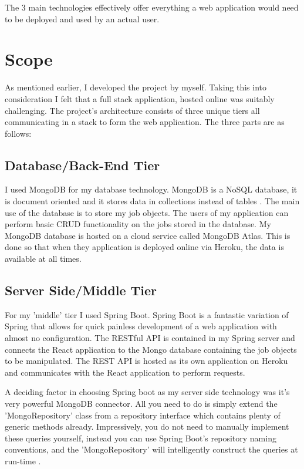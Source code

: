 The 3 main technologies effectively offer everything a web application would need to be deployed and used by an actual user.

\section{Scope}
As mentioned earlier, I developed the project by myself. Taking this into consideration I felt that a full stack application, hosted online was suitably challenging. The project's architecture consists of three unique tiers all communicating in a stack to form the web application. The three parts are as follows: 

\subsection{Database/Back-End Tier}
I used MongoDB for my database technology. MongoDB is a NoSQL database, it is document oriented and it stores data in collections instead of tables \cite{parker2013comparing}. The main use of the database is to store my job objects. The users of my application can perform basic CRUD functionality on the jobs stored in the database. My MongoDB database is hosted on a cloud service called MongoDB Atlas. This is done so that when they application is deployed online via Heroku, the data is available at all times.

\subsection{Server Side/Middle Tier}
For my 'middle' tier I used Spring Boot. Spring Boot is a fantastic variation of Spring that allows for quick painless development of a web application with almost no configuration. The RESTful API is contained in my Spring server and connects the React application to the Mongo database containing the job objects to be manipulated. The REST API is hosted as its own application on Heroku and communicates with the React application to perform requests.

A deciding factor in choosing Spring boot as my server side technology was it's very powerful MongoDB connector. All you need to do is simply extend the 'MongoRepository' class from a repository interface which contains plenty of generic methods already. Impressively, you do not need to manually implement these queries yourself, instead you can use Spring Boot's repository naming conventions, and the 'MongoRepository' will intelligently construct the queries at run-time \cite{marchioni2015mongodb}.

